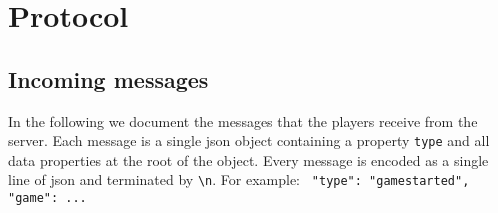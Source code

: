 \documentclass{scrartcl}
\begin{document}
\begin{mdframed}[frametitle = {Example}]
\begin{center}
  \end{center}
\end{mdframed}


\section{Protocol}

\subsection{Incoming messages}
In the following we document the messages that the players receive from the
server. Each message is a single json object containing a property \texttt{type}
and all data properties at the root of the object.
Every message is encoded as a single line of json and terminated by
\texttt{\textbackslash n}. For example:
\texttt{{ "type": "gamestarted", "game": {...} }}
\end{document}

